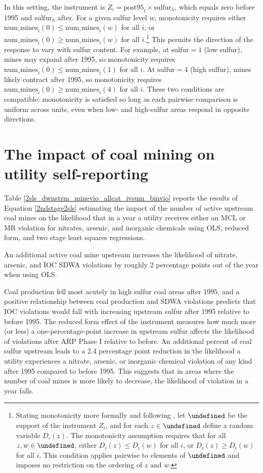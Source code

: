 \documentclass[12pt]{article}
\let\Psi\undefined
\begin{document}
In this setting, the instrument is $Z_i = \text{post95}_t \times \text{sulfur}_h$, which equals zero before 1995 and $\text{sulfur}_h$ after. For a given sulfur level $w$, monotonicity requires either $\text{num_mines}_i(0) \leq \text{num_mines}_i(w)$ for all $i$, or $\text{num_mines}_i(0) \geq \text{num_mines}_i(w)$ for all $i$.\footnote{Stating monotonicity more formally and following \textcite{angrist1994identification}, let $\Psi$ be the support of the instrument $Z_i$, and for each $z \in \Psi$ define a random variable $D_i(z)$. The monotonicity assumption requires that for all $z, w \in \Psi$, either $D_i(z) \leq D_i(w)$ for all $i$, or $D_i(z) \geq D_i(w)$ for all $i$. This condition applies pairwise to elements of $\Psi$ and imposes no restriction on the ordering of $z$ and $w$.} This permits the direction of the response to vary with sulfur content. For example, at $\text{sulfur} = 1$ (low sulfur), mines may expand after 1995, so monotonicity requires $\text{num_mines}_i(0) \leq \text{num_mines}_i(1)$ for all $i$. At $\text{sulfur} = 4$ (high sulfur), mines likely contract after 1995, so monotonicity requires $\text{num_mines}_i(0) \geq \text{num_mines}_i(4)$ for all $i$. These two conditions are compatible: monotonicity is satisfied so long as each pairwise comparison is uniform across units, even when low- and high-sulfur areas respond in opposite directions.

\section{The impact of coal mining on utility self-reporting}

Table \ref{2sls_dwnstrm_minevio_allcat_ivsum_binvio} reports the results of Equation \ref{2ndstage2sls} estimating the impact of the number of active upstream coal mines on the likelihood that in a year a utility receives either an MCL or MR violation for nitrates, arsenic, and inorganic chemicals using OLS, reduced form, and two stage least squares regressions. 

An additional active coal mine upstream increases the likelihood of nitrate, arsenic, and IOC SDWA violations by roughly 2 percentage points out of the year when using OLS.

Coal production fell most acutely in high sulfur coal areas after 1995, and a positive relationship between coal production and SDWA violations predicts that IOC violations would fall with increasing upstream sulfur after 1995 relative to before 1995. The reduced form effect of the instrument measures how much more (or less) a one-percentage-point increase in upstream sulfur affects the likelihood of violations after ARP Phase I relative to before. An additional percent of coal sulfur upstream leads to a 2.4 percentage point reduction in the likelihood a utility experiences a nitrate, arsenic, or inorganic chemical violation of any kind after 1995 compared to before 1995. This suggests that in areas where the number of coal mines is more likely to decrease, the likelihood of violation in a year falls.
\end{document}
